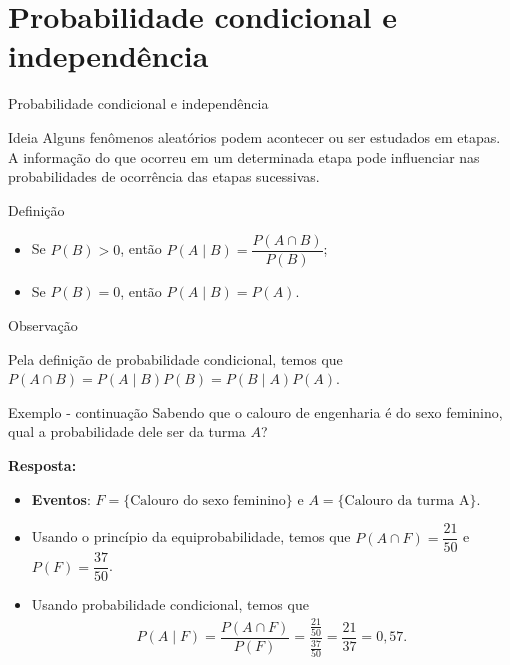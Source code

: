 \documentclass[9pt]{beamer}
\begin{document}
\section{Probabilidade condicional e independência}
\begin{frame}{Probabilidade condicional e independência}

{\small
\begin{block}{Ideia}
	Alguns fenômenos aleatórios podem acontecer ou ser estudados em etapas. A informação do que ocorreu em um determinada etapa pode influenciar nas probabilidades de ocorrência das etapas sucessivas.
\end{block}

\begin{block}{Definição}
	
	\begin{itemize}
		\item Se $P(B)>0$, então $P(A \mid B) = \dfrac{P(A \cap B)}{P(B)}$;
		\item Se $P(B)=0$, então $P(A \mid B) = P(A)$.
	\end{itemize}
\end{block}

\begin{block}{Observação}

Pela definição de probabilidade condicional, temos que 
		$P(A \cap B) = P(A \mid B) P(B) = P(B \mid A) P(A)$.

\end{block}
}
\end{frame}

\begin{frame}{Exemplo - continuação}
	Sabendo que o calouro de engenharia é do sexo feminino, qual a probabilidade dele ser da turma $A$?
	\vfill
	
	\textbf{Resposta:} 
	\begin{itemize}
		\item \textbf{Eventos}: $F = \{\mbox{Calouro do sexo feminino}\}$ e $A=\{\mbox{Calouro da turma A}\}$.
		\item Usando o princípio da equiprobabilidade, temos que $P(A \cap F) = \dfrac{21}{50}$ e $P(F) = \dfrac{37}{50}$.
		\item Usando probabilidade condicional, temos que 
		\begin{align*}
		P(A \mid F) = \dfrac{P(A \cap F)}{P(F)} = \dfrac{\frac{21}{50}}{\frac{37}{50}} = \dfrac{21}{37} = 0,57.
		\end{align*}
	\end{itemize}
\end{frame}
\end{document}
